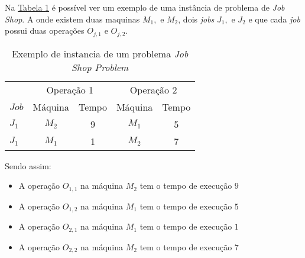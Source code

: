 Na 
\hyperref[fig:ex-instancia-problema-JSP]{Tabela \ref{fig:ex-instancia-problema-JSP}}
é possível ver um exemplo de uma instância de problema de \textit{Job Shop}. 
A onde existem duas maquinas $M_1, $ e $M_2$, 
dois \textit{jobs} $J_1, $ e $J_2$ 
e que cada \textit{job} possui 
duas operações $O_{j,1} $ e $O_{j,2}$.
    
\begin{table}[htb]
    \centering
    \caption{Exemplo de instancia de um problema \textit{Job Shop Problem}}
    \label{fig:ex-instancia-problema-JSP}
    \begin{tabular}[t]{lcccc}
        \hline
        &\multicolumn{2}{c}{Operação 1}&\multicolumn{2}{c}{Operação 2}\\
        $Job$&Máquina&Tempo&Máquina&Tempo\\
        \hline
        $J_1$&$M_2$&9&$M_1$&5\\
        $J_1$&$M_1$&1&$M_2$&7\\
        \hline
    \end{tabular}
\end{table}

\noindent Sendo assim:\hfill
\begin{itemize}
    \item A operação $O_{1,1}$ na máquina $M_2$ tem o tempo de execução $9$
    \item A operação $O_{1,2}$ na máquina $M_1$ tem o tempo de execução $5$
    \item A operação $O_{2,1}$ na máquina $M_1$ tem o tempo de execução $1$
    \item A operação $O_{2,2}$ na máquina $M_2$ tem o tempo de execução $7$
\end{itemize}
            
%



